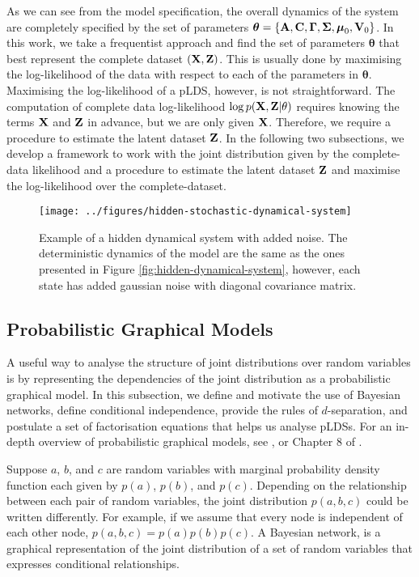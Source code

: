 \documentclass[11pt]{article}
\numberwithin{equation}{section}
\newcommand{\X}{{\bf X}}
\newcommand{\Z}{{\bf Z}}
\begin{document}
\sloppy As we can see from the model specification, the overall dynamics of the system are completely specified by the set of parameters $\boldsymbol\theta = \{{\bf A}, {\bf C}, \boldsymbol\Gamma, \boldsymbol\Sigma, \boldsymbol\mu_0, {\bf V}_0\}$. In this work, we take a frequentist approach and find the set of parameters $\boldsymbol\theta$ that best represent the complete dataset $(\X, \Z)$. This is usually done by maximising the log-likelihood of the data with respect to each of the parameters in $\boldsymbol{\theta}$. Maximising the log-likelihood of a pLDS, however, is not straightforward. The computation of complete data log-likelihood $\log p(\X, \Z \vert \theta)$ requires knowing the terms $\X$ and $\Z$ in advance, but we are only given $\X$. Therefore, we require a procedure to estimate the latent dataset $\Z$. In the following two subsections, we develop a framework to work with the joint distribution given by the complete-data likelihood and a procedure to estimate the latent dataset $\Z$ and maximise the log-likelihood over the complete-dataset.


\begin{figure}[h!]
	\centering
	\texttt{[image: ../figures/hidden-stochastic-dynamical-system]}
	\caption{Example of a hidden dynamical system with added noise. The deterministic dynamics of the model are the same as the ones presented in Figure \ref{fig:hidden-dynamical-system}, however, each state has added gaussian noise with diagonal covariance matrix.}
	\label{fig:hidden-noisy-dynamical-system}
\end{figure}


\subsection{Probabilistic Graphical Models}
A useful way to analyse the structure of joint distributions over random variables is by representing the dependencies of the joint distribution as a probabilistic graphical model. In this subsection, we define and motivate the use of Bayesian networks, define conditional independence, provide the rules of $d$-separation, and postulate a set of factorisation equations that helps us analyse pLDSs. For an in-depth overview of probabilistic graphical models, see \cite{koller2009}, or Chapter 8 of \cite{prml}.

Suppose $a$, $b$, and $c$ are random variables with marginal probability density function each given by $p(a)$, $p(b)$, and $p(c)$. Depending on the relationship between each pair of random variables, the joint distribution $p(a,b,c)$ could be written differently. For example, if we assume that every node is independent of each other node, $p(a,b,c) = p(a) p(b) p(c)$. A Bayesian network, is a graphical representation of the joint distribution of a set of random variables that expresses conditional relationships.
\end{document}
